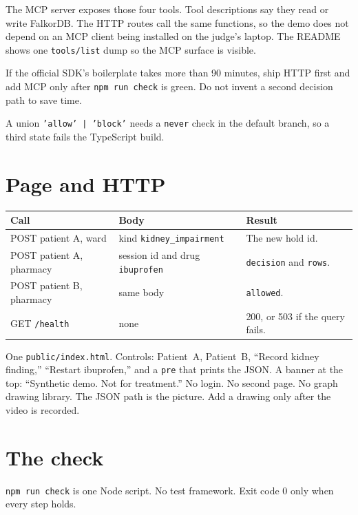 \documentclass[11pt,a4paper]{article}
\newcommand{\code}[1]{\texttt{#1}}
\newcommand{\file}[1]{\texttt{#1}}
\begin{document}
The MCP server exposes those four tools. Tool descriptions say they read or write FalkorDB. The HTTP routes call the same functions, so the demo does not depend on an MCP client being installed on the judge's laptop. The README shows one \code{tools/list} dump so the MCP surface is visible.

If the official SDK's boilerplate takes more than 90 minutes, ship HTTP first and add MCP only after \code{npm run check} is green. Do not invent a second decision path to save time.

A union \code{'allow' | 'block'} needs a \code{never} check in the default branch, so a third state fails the TypeScript build.

\section{Page and HTTP}

\begin{center}
\begin{tabularx}{\textwidth}{@{}>{\raggedright\arraybackslash}p{6.6cm}Xp{3.4cm}@{}}
\toprule
\textbf{Call} & \textbf{Body} & \textbf{Result} \\
\midrule
POST patient A, ward &
kind \code{kidney\_impairment} &
The new hold id. \\
POST patient A, pharmacy &
session id and drug \code{ibuprofen} &
\code{decision} and \code{rows}. \\
POST patient B, pharmacy &
same body &
\code{allowed}. \\
GET \code{/health} &
none &
200, or 503 if the query fails. \\
\bottomrule
\end{tabularx}
\end{center}

One \file{public/index.html}. Controls: Patient~A, Patient~B, ``Record kidney finding,'' ``Restart ibuprofen,'' and a \code{pre} that prints the JSON. A banner at the top: ``Synthetic demo. Not for treatment.''
No login. No second page. No graph drawing library. The JSON path is the picture. Add a drawing only after the video is recorded.

\section{The check}

\code{npm run check} is one Node script. No test framework. Exit code 0 only when every step holds.
\end{document}
